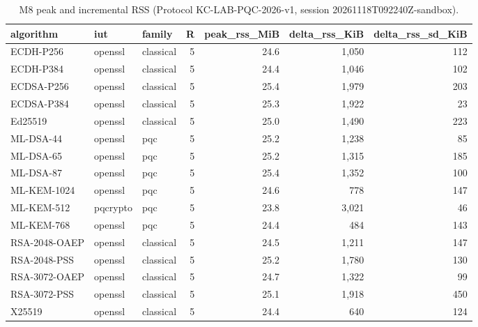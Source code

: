 \begin{table}[ht]
\centering
\caption{M8 peak and incremental RSS (Protocol KC-LAB-PQC-2026-v1, session 20261118T092240Z-sandbox).}
\label{tab:t4}
\small
\begin{tabular}{@{}lllrrrr@{}}
\toprule
algorithm & iut & family & R & peak\_rss\_MiB & delta\_rss\_KiB & delta\_rss\_sd\_KiB \\
\midrule
ECDH-P256 & openssl & classical & 5 & 24.6 & 1,050 & 112 \\
ECDH-P384 & openssl & classical & 5 & 24.4 & 1,046 & 102 \\
ECDSA-P256 & openssl & classical & 5 & 25.4 & 1,979 & 203 \\
ECDSA-P384 & openssl & classical & 5 & 25.3 & 1,922 & 23 \\
Ed25519 & openssl & classical & 5 & 25.0 & 1,490 & 223 \\
ML-DSA-44 & openssl & pqc & 5 & 25.2 & 1,238 & 85 \\
ML-DSA-65 & openssl & pqc & 5 & 25.2 & 1,315 & 185 \\
ML-DSA-87 & openssl & pqc & 5 & 25.4 & 1,352 & 100 \\
ML-KEM-1024 & openssl & pqc & 5 & 24.6 & 778 & 147 \\
ML-KEM-512 & pqcrypto & pqc & 5 & 23.8 & 3,021 & 46 \\
ML-KEM-768 & openssl & pqc & 5 & 24.4 & 484 & 143 \\
RSA-2048-OAEP & openssl & classical & 5 & 24.5 & 1,211 & 147 \\
RSA-2048-PSS & openssl & classical & 5 & 25.2 & 1,780 & 130 \\
RSA-3072-OAEP & openssl & classical & 5 & 24.7 & 1,322 & 99 \\
RSA-3072-PSS & openssl & classical & 5 & 25.1 & 1,918 & 450 \\
X25519 & openssl & classical & 5 & 24.4 & 640 & 124 \\
\bottomrule
\end{tabular}
\end{table}
